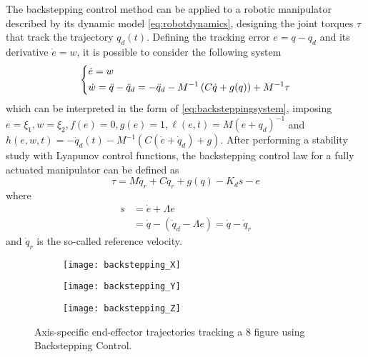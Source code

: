 The backstepping control method can be applied to a robotic manipulator described by its dynamic model \eqref{eq:robotdynamics}, designing the joint torques $\tau$ that track the trajectory $q_d(t)$. Defining the tracking error $e=q-q_d$ and its derivative $\dot{e}=w$, it is possible to consider the following system
\begin{equation}
\begin{dcases}
\dot{e} = w\\
\dot{w} = \ddot{q}-\ddot{q}_d = -\ddot{q}_d - M^{-1}\left(C\dot{q}+g(q)\right) + M^{-1}\tau
\end{dcases}
\label{eq:lagrangianbackstepping}
\end{equation}
which can be interpreted in the form of \eqref{eq:backsteppingsystem}, imposing $e=\xi_1, w=\xi_2, f(e)=0, g(e)=1, \ell(e,t)=M(e+q_d)^{-1}$ and $h(e,w,t)=-\ddot{q}_d(t)-M^{-1}\left(C(\dot{e}+\dot{q}_d)+g\right)$. After performing a stability study with Lyapunov control functions, the backstepping control law for a fully actuated manipulator can be defined as
\begin{equation}
\tau = M\ddot{q}_r + C\dot{q}_r + g(q) - K_{d}s - e
\label{eq:backsteppingcontrollaw}
\end{equation}
where
\begin{align*}
s &= \dot{e} + \Lambda{e}\\
&= \dot{q} - (\dot{q}_d - \Lambda{e}) = \dot{q} - \dot{q}_r
\end{align*}
and $\dot{q}_r$ is the so-called reference velocity.

\begin{figure}
	\centering
	\begin{subfigure}[t]{0.9\textwidth}
		\centering
		\texttt{[image: backstepping\_X]}
	\end{subfigure}
	\begin{subfigure}[t]{0.9\textwidth}
		\centering
		\texttt{[image: backstepping\_Y]}
	\end{subfigure}
	\begin{subfigure}[t]{0.9\textwidth}
		\centering
		\texttt{[image: backstepping\_Z]}
	\end{subfigure}
	\caption{Axis-specific end-effector trajectories tracking a 8 figure using Backstepping Control.}
\end{figure}

